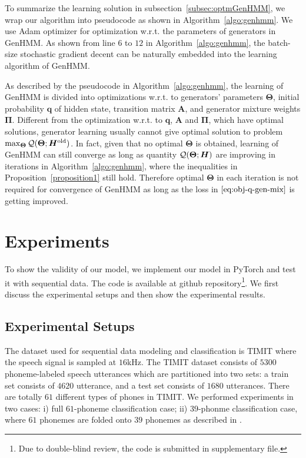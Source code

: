 \documentclass[letterpaper]{article} %
\begin{document}
To summarize the learning solution in subsection~\ref{subsec:optmGenHMM}, we wrap our algorithm into pseudocode as shown in Algorithm~\ref{algo:genhmm}. We use Adam \cite{DBLP:journals/corr/KingmaB14} optimizer for optimization w.r.t. the parameters of generators in GenHMM. As shown from line $6$ to $12$ in Algorithm~\ref{algo:genhmm}, the batch-size stochastic gradient decent can be naturally embedded into the learning algorithm of GenHMM.

As described by the pseudocode in Algorithm~\ref{algo:genhmm}, the learning of GenHMM is divided into optimizations w.r.t. to generators' parameters $\bm{\Theta}$, initial probability $\bm{q}$ of hidden state, transition matrix $\bm{A}$, and generator mixture weights $\bm{\Pi}$. Different from the optimization w.r.t. to $\bm{q}$, $\bm{A}$ and $\bm{\Pi}$, which have optimal solutions, generator learning usually cannot give optimal solution to problem $\max_{\bm{\Theta}} \mathcal{Q}(\bm{\Theta}; \bm{H}^{\mathrm{old}})$. In fact, given that no optimal $\bm{\Theta}$ is obtained, learning of GenHMM can still converge as long as quantity $\mathcal{Q}(\bm{\Theta}; \bm{H})$ are improving in iterations in Algorithm~\ref{algo:genhmm}, where the inequalities in Proposition~\ref{proposition1} still hold. Therefore optimal $\bm{\Theta}$ in each iteration is not required for convergence of GenHMM as long as the loss in $\eqref{eq:obj-q-gen-mix}$ is getting improved.




\section{Experiments}
To show the validity of our model, we implement our model in PyTorch and test it with sequential data. The code is available at github repository\footnote{Due to double-blind review, the code is submitted in supplementary file.}. We first discuss the experimental setups and then show the experimental results.

\subsection{Experimental Setups}
The dataset used for sequential data modeling and classification is TIMIT where the speech signal is sampled at $16$kHz.
The TIMIT dataset consists of $5300$ phoneme-labeled speech utterances which are partitioned into two sets: {a train set consists of $4620$ utterance, and a test set consists of $1680$ utterances.} There are totally $61$ different types of phones in TIMIT.
We performed experiments in two cases: i) full $61$-phoneme classification case; ii) $39$-phonme classification case, where $61$ phonemes are folded onto $39$ phonemes as described in \cite{Perdigao11}.
\end{document}
